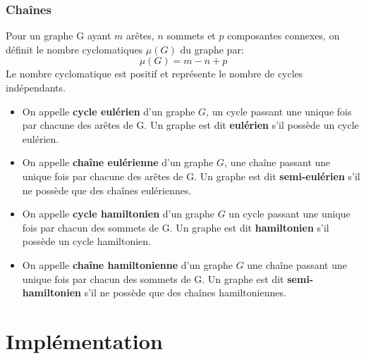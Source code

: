 \begin{frame}[fragile]
\frametitle{Chaînes}

\begin{defi}
Pour un graphe G ayant $m$ arêtes, $n$ sommets et $p$ composantes connexes, on définit le nombre cyclomatiques $\mu(G)$ du graphe par:
$$\mu(G)= m - n + p $$
Le nombre cyclomatique est positif et représente le nombre de cycles indépendants.
\end{defi}

\begin{itemize}
 \item On appelle \textbf{cycle eulérien} d'un graphe $G$,  un cycle passant une unique fois par chacune des arêtes de G. Un graphe est dit \textbf{eulérien} s'il possède un cycle eulérien.
 \item On appelle \textbf{chaîne eulérienne} d'un graphe $G$,  une chaîne passant une unique fois par chacune des arêtes de G. Un graphe est dit \textbf{semi-eulérien} s'il ne possède que des chaînes eulériennes.
 \item On appelle \textbf{cycle hamiltonien} d'un graphe $G$  un cycle passant une unique fois par chacun des sommets de G. Un graphe est dit \textbf{hamiltonien} s'il possède un cycle hamiltonien.
 \item On appelle \textbf{chaîne hamiltonienne} d'un graphe $G$  une chaîne passant  une unique fois par chacun des sommets de G. Un graphe est dit \textbf{semi-hamiltonien} s'il ne possède que des chaînes hamiltoniennes.
\end{itemize}
\end{frame}

\section{Implémentation}


